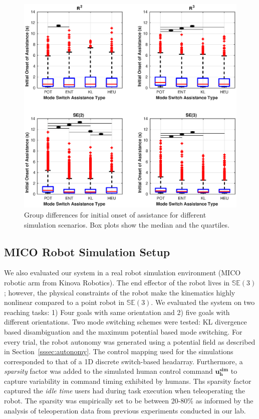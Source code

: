 \documentclass[conference]{IEEEtran}
\begin{document}
 \begin{figure}[t!]
	\centering
	\includegraphics[width= 1.\hsize, height=0.6\vsize]{./figures/initial_alpha.eps}
	\vspace{-0.75cm}
	\caption{Group differences for initial onset of assistance for different simulation scenarios. Box plots show the median and the quartiles.} 
	\label{fig:initial_alpha}
\end{figure}



\subsection{MICO Robot Simulation Setup}
We also evaluated our system in a real robot simulation environment (MICO robotic arm from Kinova Robotics). The end effector of the robot lives in $\mathbb{SE}(3)$; however, the physical constraints of the robot make the kinematics highly nonlinear compared to a point robot in $\mathbb{SE}(3)$. We evaluated the system on two reaching tasks: 1) Four goals with same orientation and 2) five goals with different orientations. Two mode switching schemes were tested: KL divergence based disambiguation and the maximum potential based mode switching. For every trial, the robot autonomy was generated using a potential field as described in Section~\ref{sssec:autonomy}. The control mapping used for the simulations corresponded to that of a 1D discrete switch-based headarray.
Furthermore, a \textit{sparsity} factor was added to the simulated human control command $\boldsymbol{u^{sim}_h}$ to capture variability in command timing exhibited by humans. Ths sparsity factor captured the \textit{idle time} users had during task execution when teleoperating the robot. The sparsity was empirically set to be between 20-80\% as informed by the analysis of teleoperation data from previous experiments conducted in our lab. 
\end{document}
